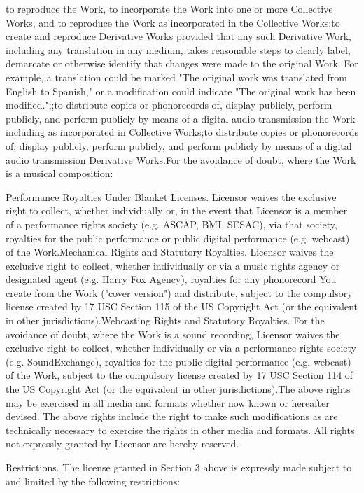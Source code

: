 to reproduce the Work, to incorporate the Work into one or more Collective Works, and to reproduce the Work as incorporated in the Collective Works;to create and reproduce Derivative Works provided that any such Derivative Work, including any translation in any medium, takes reasonable steps to clearly label, demarcate or otherwise identify that changes were made to the original Work. For example, a translation could be marked "{}\+The original work was translated from English to Spanish,"{} or a modification could indicate "{}\+The original work has been modified."{};;to distribute copies or phonorecords of, display publicly, perform publicly, and perform publicly by means of a digital audio transmission the Work including as incorporated in Collective Works;to distribute copies or phonorecords of, display publicly, perform publicly, and perform publicly by means of a digital audio transmission Derivative Works.\+For the avoidance of doubt, where the Work is a musical composition\+:

Performance Royalties Under Blanket Licenses. Licensor waives the exclusive right to collect, whether individually or, in the event that Licensor is a member of a performance rights society (e.\+g. ASCAP, BMI, SESAC), via that society, royalties for the public performance or public digital performance (e.\+g. webcast) of the Work.\+Mechanical Rights and Statutory Royalties. Licensor waives the exclusive right to collect, whether individually or via a music rights agency or designated agent (e.\+g. Harry Fox Agency), royalties for any phonorecord You create from the Work ("{}cover version"{}) and distribute, subject to the compulsory license created by 17 USC Section 115 of the US Copyright Act (or the equivalent in other jurisdictions).Webcasting Rights and Statutory Royalties. For the avoidance of doubt, where the Work is a sound recording, Licensor waives the exclusive right to collect, whether individually or via a performance-\/rights society (e.\+g. Sound\+Exchange), royalties for the public digital performance (e.\+g. webcast) of the Work, subject to the compulsory license created by 17 USC Section 114 of the US Copyright Act (or the equivalent in other jurisdictions).The above rights may be exercised in all media and formats whether now known or hereafter devised. The above rights include the right to make such modifications as are technically necessary to exercise the rights in other media and formats. All rights not expressly granted by Licensor are hereby reserved.


\begin{DoxyEnumerate}
\item Restrictions. The license granted in Section 3 above is expressly made subject to and limited by the following restrictions\+:
\end{DoxyEnumerate}

